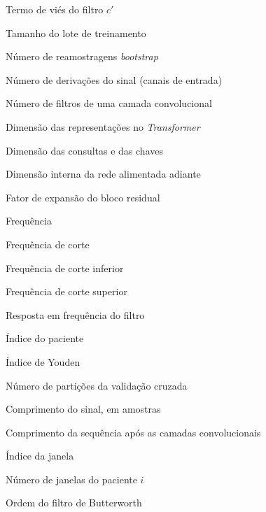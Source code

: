 

\begin{simbolos} \itemsep -1pt
	\item[$ b_{c'} $] Termo de viés do filtro $c'$
	\item[$ B $] Tamanho do lote de treinamento
	\item[$ B^{*} $] Número de reamostragens \textit{bootstrap}
	\item[$ C $] Número de derivações do sinal (canais de entrada)
	\item[$ C' $] Número de filtros de uma camada convolucional
	\item[$ d $] Dimensão das representações no \textit{Transformer}
	\item[$ d_k $] Dimensão das consultas e das chaves
	\item[$ d_{\mathrm{ff}} $] Dimensão interna da rede alimentada adiante
	\item[$ E $] Fator de expansão do bloco residual
	\item[$ f $] Frequência
	\item[$ f_c $] Frequência de corte
	\item[$ f_{\mathrm{inf}} $] Frequência de corte inferior
	\item[$ f_{\mathrm{sup}} $] Frequência de corte superior
	\item[$ H(f) $] Resposta em frequência do filtro
	\item[$ i $] Índice do paciente
	\item[$ J $] Índice de Youden
	\item[$ K $] Número de partições da validação cruzada
	\item[$ L $] Comprimento do sinal, em amostras
	\item[$ L' $] Comprimento da sequência após as camadas convolucionais
	\item[$ m $] Índice da janela
	\item[$ M_i $] Número de janelas do paciente $i$
	\item[$ n $] Ordem do filtro de Butterworth

\end{simbolos}
